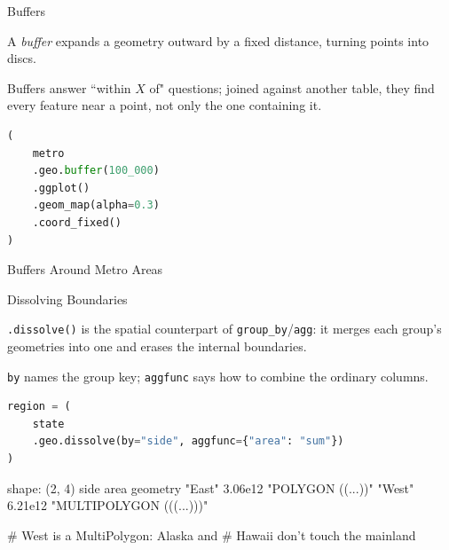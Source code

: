 \documentclass[8pt,aspectratio=169]{beamer}
\begin{document}
\begin{frame}[fragile]{Buffers}
\begin{splitcode}{%

A \textit{buffer} expands a geometry outward by a fixed distance, turning points into discs.

Buffers answer ``within $X$ of" questions; joined against another table, they find every feature near a point, not only the one containing it.

}
\begin{lstlisting}[language=Python]
(
    metro
    .geo.buffer(100_000)
    .ggplot()
    .geom_map(alpha=0.3)
    .coord_fixed()
)
\end{lstlisting}
\end{splitcode}
\end{frame}

\begin{rightframe}{Buffers Around Metro Areas}
\end{rightframe}

\begin{frame}[fragile]{Dissolving Boundaries}
\begin{splitcode}{%

\texttt{.dissolve()} is the spatial counterpart of \texttt{group\_by}/\texttt{agg}: it merges each group's geometries into one and erases the internal boundaries.

\texttt{by} names the group key; \texttt{aggfunc} says how to combine the ordinary columns.

}
\begin{lstlisting}[language=Python]
region = (
    state
    .geo.dissolve(by="side", aggfunc={"area": "sum"})
)
\end{lstlisting}
\begin{codeoutput}
shape: (2, 4)
side    area     geometry
"East"  3.06e12  "POLYGON ((...))"
"West"  6.21e12  "MULTIPOLYGON (((...)))"

# West is a MultiPolygon: Alaska and
# Hawaii don't touch the mainland
\end{codeoutput}
\end{splitcode}
\end{frame}
\end{document}
